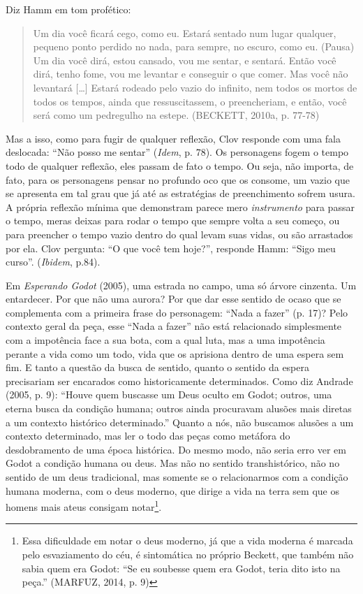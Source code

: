 Diz Hamm em tom profético:

\begin{quote}
Um dia você ficará cego, como eu. Estará sentado num lugar qualquer,
pequeno ponto perdido no nada, para sempre, no escuro, como eu. (Pausa)
Um dia você dirá, estou cansado, vou me sentar, e sentará. Então você
dirá, tenho fome, vou me levantar e conseguir o que comer. Mas você não
levantará {[}\ldots{}{]} Estará rodeado pelo vazio do infinito, nem
todos os mortos de todos os tempos, ainda que ressuscitassem, o
preencheriam, e então, você será como um pedregulho na estepe. (BECKETT,
2010a, p. 77-78)
\end{quote}

Mas a isso, como para fugir de qualquer reflexão, Clov responde com uma
fala deslocada: ``Não posso me sentar'' (\emph{Idem}, p. 78). Os
personagens fogem o tempo todo de qualquer reflexão, eles passam de fato
o tempo. Ou seja, não importa, de fato, para os personagens pensar no
profundo oco que os consome, um vazio que se apresenta em tal grau que
já até as estratégias de preenchimento sofrem usura. A própria reflexão
mínima que demonstram parece mero \emph{instrumento} para passar o
tempo, meras deixas para rodar o tempo que sempre volta a seu começo, ou
para preencher o tempo vazio dentro do qual levam suas vidas, ou são
arrastados por ela. Clov pergunta: ``O que você tem hoje?'', responde
Hamm: ``Sigo meu curso''. (\emph{Ibidem}, p.84).

Em \emph{Esperando Godot} (2005), uma estrada no campo, uma só árvore
cinzenta. Um entardecer. Por que não uma aurora? Por que dar esse
sentido de ocaso que se complementa com a primeira frase do personagem:
``Nada a fazer'' (p. 17)? Pelo contexto geral da peça, esse ``Nada a
fazer'' não está relacionado simplesmente com a impotência face a sua
bota, com a qual luta, mas a uma impotência perante a vida como um todo,
vida que os aprisiona dentro de uma espera sem fim. E tanto a questão da
busca de sentido, quanto o sentido da espera precisariam ser encarados
como historicamente determinados. Como diz Andrade (2005, p. 9): ``Houve
quem buscasse um Deus oculto em Godot; outros, uma eterna busca da
condição humana; outros ainda procuravam alusões mais diretas a um
contexto histórico determinado.'' Quanto a nós, não buscamos alusões a
um contexto determinado, mas ler o todo das peças como metáfora do
desdobramento de uma época histórica. Do mesmo modo, não seria erro ver
em Godot a condição humana ou deus. Mas não no sentido transhistórico,
não no sentido de um deus tradicional, mas somente se o relacionarmos
com a condição humana moderna, com o deus moderno, que dirige a vida na
terra sem que os homens mais ateus consigam notar\footnote{Essa
  dificuldade em notar o deus moderno, já que a vida moderna é marcada
  pelo esvaziamento do céu, é sintomática no próprio Beckett, que também
  não sabia quem era Godot: ``Se eu soubesse quem era Godot, teria dito
  isto na peça.'' (MARFUZ, 2014, p. 9)}.

